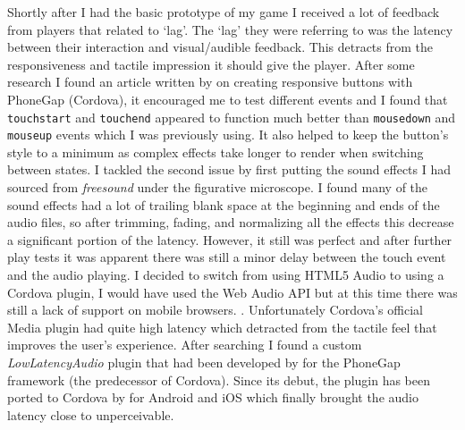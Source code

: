 \documentclass[final]{cmpreport}
\begin{document}
Shortly after I had the basic prototype of my game I received a lot of feedback from players that related to `lag'. The `lag' they were referring to was the latency between their interaction and visual/audible feedback. This detracts from the responsiveness and tactile impression it should give the player. After some research I found an article written by \cite{Croft} on creating responsive buttons with PhoneGap (Cordova), it encouraged me to test different events and I found that \texttt{touchstart} and \texttt{touchend} appeared to function much better than \texttt{mousedown} and \texttt{mouseup} events which I was previously using. It also helped to keep the button's style to a minimum as complex effects take longer to render when switching between states. I tackled the second issue by first putting the sound effects I had sourced from \textit{freesound} under the figurative microscope. I found many of the sound effects had a lot of trailing blank space at the beginning and ends of the audio files, so after trimming, fading, and normalizing all the effects this decrease a significant portion of the latency. However, it still was perfect and after further play tests it was apparent there was still a minor delay between the touch event and the audio playing. I decided to switch from using HTML5 Audio to using a Cordova plugin, I would have used the Web Audio API but at this time there was still a lack of support on mobile browsers. . Unfortunately Cordova's official Media plugin had quite high latency which detracted from the tactile feel that improves the user's experience. After searching I found a custom \textit{LowLatencyAudio} plugin that had been developed by \citep{Trice} for the PhoneGap framework (the predecessor of Cordova). Since its debut, the plugin has been ported to Cordova by \citep{Xie} for Android and iOS which finally brought the audio latency close to unperceivable.
\end{document}
